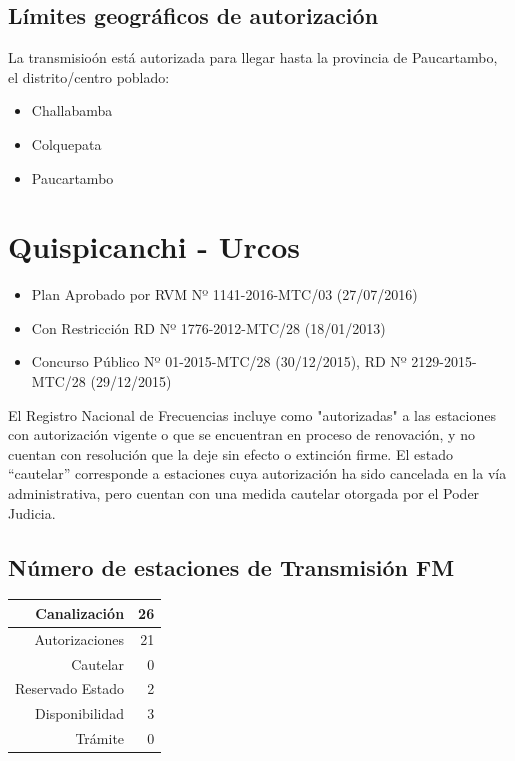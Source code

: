 \documentclass[11pt]{article}
\begin{document}
\subsection{Límites geográficos de autorización}

La transmisioón está autorizada para llegar hasta la provincia de Paucartambo, el distrito/centro poblado:

\begin{itemize}
	\item Challabamba
	\item Colquepata
	\item Paucartambo
\end{itemize}



\section{Quispicanchi - Urcos}

\begin{itemize}
	\item Plan Aprobado por RVM Nº 1141-2016-MTC/03 (27/07/2016)
	\item Con Restricción RD Nº 1776-2012-MTC/28 (18/01/2013)
	\item Concurso Público Nº 01-2015-MTC/28 (30/12/2015), RD Nº 2129-2015-MTC/28 (29/12/2015)
\end{itemize}

El Registro Nacional de Frecuencias incluye como "autorizadas" a las estaciones con autorización vigente o que se encuentran en proceso de renovación, y no cuentan con resolución que la deje sin efecto o extinción firme. El estado “cautelar” corresponde a estaciones cuya autorización ha sido cancelada en la vía administrativa, pero cuentan con una medida cautelar otorgada por el Poder Judicia.

\subsection{Número de estaciones de Transmisión FM}

\begin{tabular}{|r|r|} \hline
	Canalización 			& 26 \\ \hline
	Autorizaciones			& 21 \\ \hline
	Cautelar				& 0 \\ \hline
	Reservado Estado		& 2 \\ \hline
	Disponibilidad			& 3 \\ \hline
	Trámite					& 0 \\ \hline 
\end{tabular}
\end{document}
